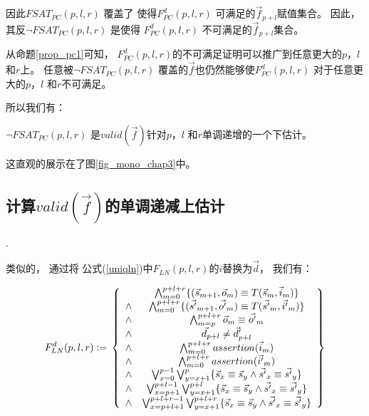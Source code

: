 因此$FSAT_{PC}(p,l,r)$ 覆盖了
使得$F^d_{PC}(p,l,r)$ 可满足的$\vec{f}_{p+l}$赋值集合。
因此，
其反$\neg FSAT_{PC}(p,l,r)$ 是使得
$F^d_{PC}(p,l,r)$ 不可满足的$\vec{f}_{p+l}$集合。

从命题\ref{prop_pc1}可知，
$F^d_{PC}(p,l,r)$的不可满足证明可以推广到任意更大的$p$，$l$ 和$r$上。
任意被$\neg FSAT_{PC}(p,l,r)$ 覆盖的$\vec{f}$也仍然能够使$F^d_{PC}(p,l,r)$ 对于任意更大的$p$，$l$ 和$r$不可满足。

所以我们有：

\begin{proposition}\label{prop_pc}
$\neg FSAT_{PC}(p,l,r)$ 是$valid(\vec{f})$针对$p$，$l$ 和$r$单调递增的一个下估计。
\end{proposition}


这直观的展示在了图\ref{fig_mono_chap3}中。

\subsection{计算$valid(\vec{f})$的单调递减上估计}\label{subsub_loop}.

类似的，
通过将 公式(\ref{uniqln})中$F_{LN}(p,l,r)$的$i$替换为$\vec{d}$，
我们有：

\begin{equation}\label{uniqlnd}
F^d_{LN}(p,l,r):=\\
\left\{
\begin{array}{cc}
&\bigwedge_{m=0}^{p+l+r}
\{
(\vec{s}_{m+1},\vec{o}_m)\equiv T(\vec{s}_m,\vec{i}_m)
\}
\\
\wedge&\bigwedge_{m=0}^{p+l+r}
\{
(\vec{s'}_{m+1},\vec{o'}_m)\equiv T(\vec{s'}_m,\vec{i'}_m)
\}
\\
\wedge&\bigwedge_{m=p}^{p+l+r}\vec{o}_m\equiv \vec{o'}_m \\
\wedge& \vec{d}_{p+l}\ne \vec{d}'_{p+l} \\
\wedge&\bigwedge_{m=0}^{p+l+r}assertion(\vec{i}_m) \\
\wedge&\bigwedge_{m=0}^{p+l+r}assertion(\vec{i'}_m) \\
\wedge&\bigvee_{x=0}^{p-1}\bigvee_{y=x+1}^{p} \{\vec{s}_x\equiv \vec{s}_y\wedge \vec{s'}_x\equiv \vec{s'}_y\} \\
\wedge&\bigvee_{x=p+1}^{p+l-1}\bigvee_{y=x+1}^{p+l} \{\vec{s}_x\equiv \vec{s}_y\wedge \vec{s'}_x\equiv \vec{s'}_y\} \\
\wedge&\bigvee_{x=p+l+1}^{p+l+r-1}\bigvee_{y=x+1}^{p+l+r} \{\vec{s}_x\equiv \vec{s}_y\wedge \vec{s'}_x\equiv \vec{s'}_y\}
\end{array}
\right\}
\end{equation}

